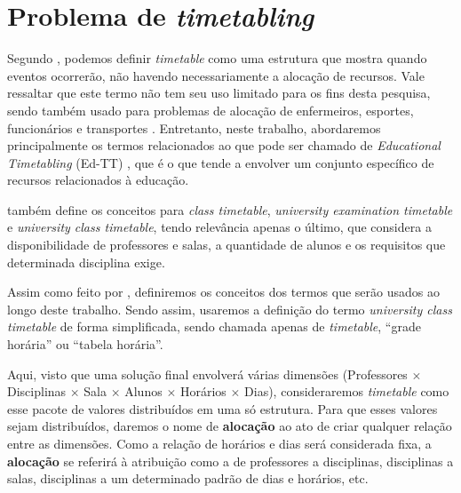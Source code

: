\section{Problema de \textit{timetabling}} \label{sec:termos}                                                        %


Segundo , podemos definir \textit{timetable} como uma estrutura que mostra quando eventos ocorrerão, não havendo necessariamente a alocação de recursos. Vale ressaltar que este termo não tem seu uso limitado para os fins desta pesquisa, sendo também usado para problemas de alocação de enfermeiros, esportes, funcionários e transportes \cite{Arratia2021}. Entretanto, neste trabalho, abordaremos principalmente os termos relacionados ao que pode ser chamado de \textit{Educational Timetabling} (Ed-TT) \cite{Alencar2019}, que é o que tende a envolver um conjunto específico de recursos relacionados à educação.

 também define os conceitos para \textit{class timetable}, \textit{university examination timetable} e \textit{university class timetable}, tendo relevância apenas o último, que considera a disponibilidade de professores e salas, a quantidade de alunos e os requisitos que determinada disciplina exige.

Assim como feito por , definiremos os conceitos dos termos que serão usados ao longo deste trabalho. Sendo assim, usaremos a definição do termo \textit{university class timetable} de forma simplificada, sendo chamada apenas de \textit{timetable}, ``grade horária'' ou ``tabela horária''.


Aqui, visto que uma solução final envolverá várias dimensões (Professores $\times$ Disciplinas $\times$ Sala $\times$ Alunos $\times$ Horários $\times$ Dias), consideraremos \textit{timetable} como esse pacote de valores distribuídos em uma só estrutura. Para que esses valores sejam distribuídos, daremos o nome de \textbf{alocação} ao ato de criar qualquer relação entre as dimensões. Como a relação de horários e dias será considerada fixa, a \textbf{alocação} se referirá à atribuição como a de professores a disciplinas, disciplinas a salas, disciplinas a um determinado padrão de dias e horários, etc.

